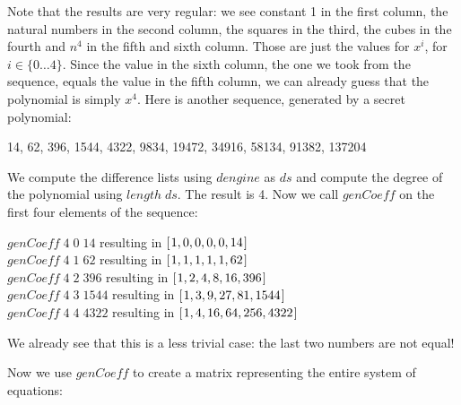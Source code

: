 \documentclass[tikz]{scrreprt}
\newcommand{\Varid}[1]{\mathit{#1}}
\begin{document}
Note that the results are very regular:
we see constant 1 in the first column,
the natural numbers in the second column,
the squares in the third, the cubes in the fourth and
$n^4$ in the fifth and sixth column.
Those are just the values for $x^i$, 
for $i \in \lbrace 0\dots 4\rbrace$.
Since the value in the sixth column, the one we took
from the sequence, equals the value in the fifth column,
we can already guess that the polynomial is simply $x^4$.
Here is another sequence, generated by a secret polynomial:

14, 62, 396, 1544, 4322, 9834, 19472, 34916, 58134, 91382, 137204

We compute the difference lists using 
\ensuremath{\Varid{dengine}} as \ensuremath{\Varid{ds}} and compute the degree of the polynomial
using \ensuremath{\Varid{length}\;\Varid{ds}}. The result is 4.
Now we call \ensuremath{\Varid{genCoeff}} on the first four elements of the sequence:

\begin{minipage}{\textwidth}
\ensuremath{\Varid{genCoeff}\;\mathrm{4}\;\mathrm{0}\;\mathrm{14}} resulting in \ensuremath{[\mskip1.5mu \mathrm{1},\mathrm{0},\mathrm{0},\mathrm{0},\mathrm{0},\mathrm{14}\mskip1.5mu]}\\
\ensuremath{\Varid{genCoeff}\;\mathrm{4}\;\mathrm{1}\;\mathrm{62}} resulting in \ensuremath{[\mskip1.5mu \mathrm{1},\mathrm{1},\mathrm{1},\mathrm{1},\mathrm{1},\mathrm{62}\mskip1.5mu]}\\
\ensuremath{\Varid{genCoeff}\;\mathrm{4}\;\mathrm{2}\;\mathrm{396}} resulting in \ensuremath{[\mskip1.5mu \mathrm{1},\mathrm{2},\mathrm{4},\mathrm{8},\mathrm{16},\mathrm{396}\mskip1.5mu]}\\
\ensuremath{\Varid{genCoeff}\;\mathrm{4}\;\mathrm{3}\;\mathrm{1544}} resulting in \ensuremath{[\mskip1.5mu \mathrm{1},\mathrm{3},\mathrm{9},\mathrm{27},\mathrm{81},\mathrm{1544}\mskip1.5mu]}\\
\ensuremath{\Varid{genCoeff}\;\mathrm{4}\;\mathrm{4}\;\mathrm{4322}} resulting in \ensuremath{[\mskip1.5mu \mathrm{1},\mathrm{4},\mathrm{16},\mathrm{64},\mathrm{256},\mathrm{4322}\mskip1.5mu]}
\end{minipage}

We already see that this is a less trivial case:
the last two numbers are not equal!

Now we use \ensuremath{\Varid{genCoeff}} to create a matrix representing
the entire system of equations:
\end{document}
